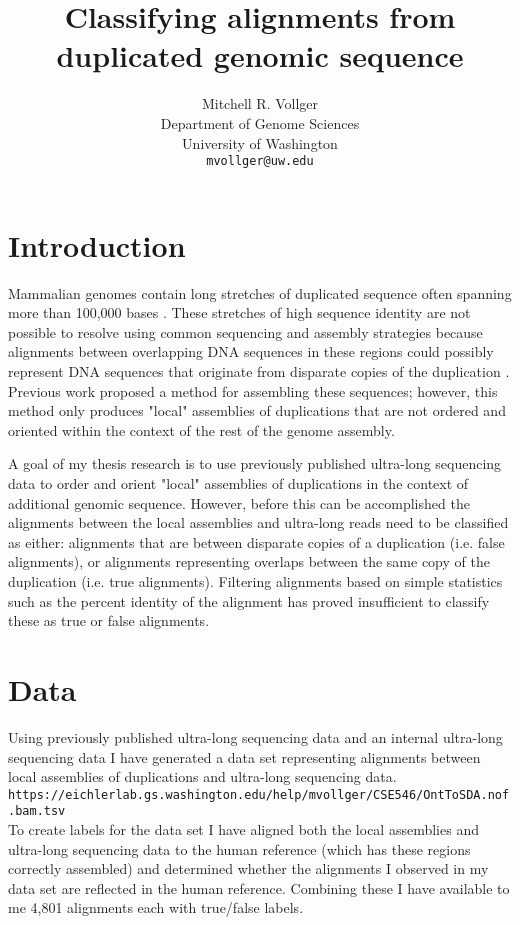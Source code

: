 \documentclass{article}
\title{\large{Classifying alignments from duplicated genomic sequence}}
\author{
  Mitchell R. Vollger
    \\
  Department of Genome Sciences\\
  University of Washington\\
  \texttt{mvollger@uw.edu} \\
}
\begin{document}

\maketitle

\section*{Introduction}

Mammalian genomes contain long stretches of duplicated sequence often spanning more than 100,000 bases \parencite{Lander2001, Waterston2002}. These stretches of high sequence identity are not possible to resolve using common sequencing and assembly strategies because alignments between overlapping DNA sequences in these regions could possibly represent DNA sequences that originate from disparate copies of the duplication \parencite{Pop2004, Chin2016, Gordon2016, Koren2017}. Previous work \parencite{Chaisson2017, Vollger2018} proposed a method for assembling these sequences; however, this method only produces "local" assemblies of duplications that are not ordered and oriented within the context of the rest of the genome assembly.

A goal of my thesis research is to use previously published ultra-long sequencing data \parencite{Jain2018} to order and orient "local" assemblies of duplications in the context of additional genomic sequence. However, before this can be accomplished the alignments between the local assemblies and ultra-long reads need to be classified as either: alignments that are between disparate copies of a duplication (i.e. false alignments), or alignments representing overlaps between the same copy of the duplication (i.e. true alignments). Filtering alignments based on simple statistics such as the percent identity of the alignment has proved insufficient to classify these as true or false alignments. 

\section*{Data}
Using previously published ultra-long sequencing data \parencite{Jain2018} and an internal ultra-long sequencing data I have generated a data set representing alignments between local assemblies of duplications and ultra-long sequencing data.\\
\texttt{https://eichlerlab.gs.washington.edu/help/mvollger/CSE546/OntToSDA.nof.bam.tsv} \\
To create labels for the data set I have aligned both the local assemblies and ultra-long sequencing data to the human reference (which has these regions correctly assembled) and determined whether the alignments I observed in my data set are reflected in the human reference. Combining these I have available to me 4,801 alignments each with true/false labels.  
\end{document}

